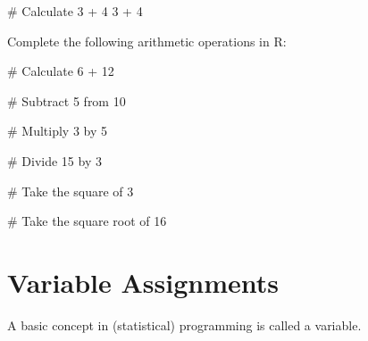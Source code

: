 \documentclass[
  12pt,
  a4paper,
]{scrbook}
\newenvironment{Shaded}{\begin{snugshade}}{\end{snugshade}}
\newcommand{\CommentTok}[1]{\textcolor[rgb]{0.37,0.37,0.37}{#1}}
\newcommand{\DecValTok}[1]{\textcolor[rgb]{0.68,0.00,0.00}{#1}}
\newcommand{\SpecialCharTok}[1]{\textcolor[rgb]{0.37,0.37,0.37}{#1}}
\theoremstyle{plain}
\theoremstyle{definition}
\theoremstyle{remark}
\begin{document}
\begin{Shaded}
\begin{Highlighting}[]
\CommentTok{\# Calculate 3 + 4}
\DecValTok{3} \SpecialCharTok{+} \DecValTok{4}
\end{Highlighting}
\end{Shaded}

Complete the following arithmetic operations in R:

\begin{Shaded}
\begin{Highlighting}[]
\CommentTok{\# Calculate 6 + 12}
\end{Highlighting}
\end{Shaded}

\begin{Shaded}
\begin{Highlighting}[]
\CommentTok{\# Subtract 5 from 10}
\end{Highlighting}
\end{Shaded}

\begin{Shaded}
\begin{Highlighting}[]
\CommentTok{\# Multiply 3 by 5}
\end{Highlighting}
\end{Shaded}

\begin{Shaded}
\begin{Highlighting}[]
\CommentTok{\# Divide 15 by 3}
\end{Highlighting}
\end{Shaded}

\begin{Shaded}
\begin{Highlighting}[]
\CommentTok{\# Take the square of 3}
\end{Highlighting}
\end{Shaded}

\begin{Shaded}
\begin{Highlighting}[]
\CommentTok{\# Take the square root of 16}
\end{Highlighting}
\end{Shaded}

\section{Variable Assignments}\label{variable-assignments}

A basic concept in (statistical) programming is called a variable.
\end{document}
